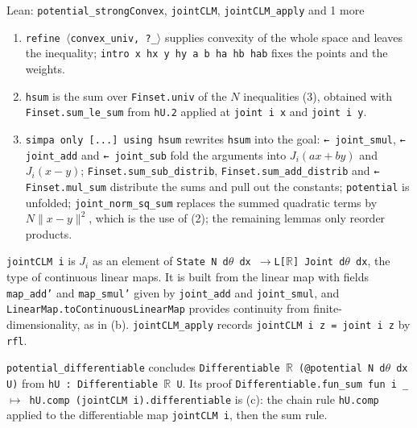 \documentclass[11pt,a4paper]{article}
\begin{document}
\begin{leanbox}{Lean: \texttt{potential\_\allowbreak{}strongConvex}, \texttt{jointCLM}, \texttt{jointCLM\_\allowbreak{}apply} and 1 more}
\begin{enumerate}


\item \texttt{refine \ensuremath{\langle}convex\_\allowbreak{}univ, ?\_\allowbreak{}\ensuremath{\rangle}} supplies convexity of the whole space and leaves the inequality; \texttt{intro x hx y hy a b ha hb hab} fixes the points and the weights.

\item \texttt{hsum} is the sum over \texttt{Finset.\allowbreak{}univ} of the \(N\) inequalities (3), obtained with \texttt{Finset.\allowbreak{}sum\_\allowbreak{}le\_\allowbreak{}sum} from \texttt{h\allowbreak{}U.\allowbreak{}2} applied at \texttt{joint i x} and \texttt{joint i y}.

\item \texttt{simpa only [.\allowbreak{}.\allowbreak{}.\allowbreak{}] using hsum} rewrites \texttt{hsum} into the goal: \texttt{← joint\_\allowbreak{}smul}, \texttt{← joint\_\allowbreak{}add} and \texttt{← joint\_\allowbreak{}sub} fold the arguments into \(J_i(ax+by)\) and \(J_i(x-y)\); \texttt{Finset.\allowbreak{}sum\_\allowbreak{}sub\_\allowbreak{}distrib}, \texttt{Finset.\allowbreak{}sum\_\allowbreak{}add\_\allowbreak{}distrib} and \texttt{← Finset.\allowbreak{}mul\_\allowbreak{}sum} distribute the sums and pull out the constants; \texttt{potential} is unfolded; \texttt{joint\_\allowbreak{}norm\_\allowbreak{}sq\_\allowbreak{}sum} replaces the summed quadratic terms by \(N\|x-y\|^2\), which is the use of (2); the remaining lemmas only reorder products.

\end{enumerate}



\texttt{joint\allowbreak{}CLM i} is \(J_i\) as an element of \texttt{State N d\ensuremath{\theta} dx \ensuremath{\to}L[\ensuremath{\mathbb R}] Joint d\ensuremath{\theta} dx}, the type of continuous linear maps. It is built from the linear map with fields \texttt{map\_\allowbreak{}add'} and \texttt{map\_\allowbreak{}smul'} given by \texttt{joint\_\allowbreak{}add} and \texttt{joint\_\allowbreak{}smul}, and \texttt{Linear\allowbreak{}Map.\allowbreak{}to\allowbreak{}Continuous\allowbreak{}Linear\allowbreak{}Map} provides continuity from finite-dimensionality, as in (b). \texttt{joint\allowbreak{}CLM\_\allowbreak{}apply} records \texttt{joint\allowbreak{}CLM i z = joint i z} by \texttt{rfl}.




\texttt{potential\_\allowbreak{}differentiable} concludes \texttt{Differentiable \ensuremath{\mathbb R} (@potential N d\ensuremath{\theta} dx U)} from \texttt{h\allowbreak{}U : Differentiable \ensuremath{\mathbb R} U}. Its proof \texttt{Differentiable.\allowbreak{}fun\_\allowbreak{}sum fun i \_\allowbreak{} \ensuremath{\mapsto} h\allowbreak{}U.\allowbreak{}comp (joint\allowbreak{}CLM i).\allowbreak{}differentiable} is (c): the chain rule \texttt{h\allowbreak{}U.\allowbreak{}comp} applied to the differentiable map \texttt{joint\allowbreak{}CLM i}, then the sum rule.
\end{leanbox}
\end{document}
